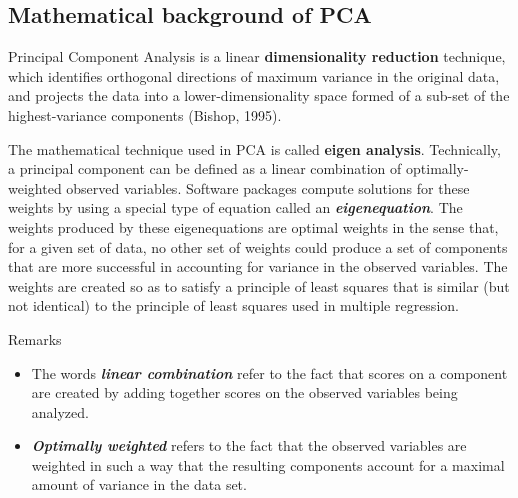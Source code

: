 \documentclass[a4paper,12pt]{article}
\begin{document}
\subsection{Mathematical background of PCA}
Principal Component Analysis is a linear \textbf{dimensionality reduction} technique, which identifies orthogonal directions of maximum variance in the original data, and projects the data into a lower-dimensionality space formed of a sub-set of the highest-variance components (Bishop, 1995).


The mathematical technique used in PCA is called \textbf{eigen analysis}. Technically, a principal component can be
defined as a linear combination of optimally-weighted observed variables. Software packages compute solutions for these weights by using a special
type of equation called an \textbf{\emph{eigenequation}}. The weights produced by these eigenequations are
optimal weights in the sense that, for a given set of data, no other set of weights could produce a
set of components that are more successful in accounting for variance in the observed variables.
The weights are created so as to satisfy a principle of least squares that is similar (but not identical) to
the principle of least squares used in multiple regression.

Remarks
\begin{itemize}
	\item The words \textbf{\emph{linear combination}} refer to the fact that scores on a
	component are created by adding together scores on the observed variables being analyzed.
	\item \textbf{\emph{Optimally weighted}} refers to the fact that the observed variables are weighted in such a way
	that the resulting components account for a maximal amount of variance in the data set.
\end{itemize}

\end{document}
